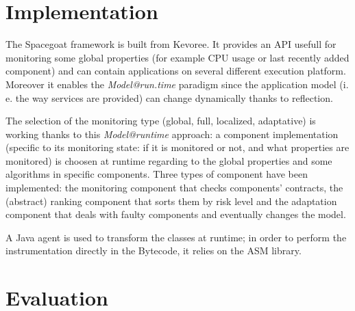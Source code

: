\section{Implementation}

The \textsf{Spacegoat} framework is built from \textsf{Kevoree}. It provides an API usefull for monitoring some global properties (for example CPU usage or last recently added component) and can contain applications on several different execution platform. Moreover it enables the \emph{Model@run.time} paradigm since the application model (i. e. the way services are provided) can change dynamically thanks to reflection. 

The selection of the monitoring type (global, full, localized, adaptative) is working thanks to this \emph{Model@runtime} approach: a component implementation (specific to  its monitoring state: if it is monitored or not, and what properties are monitored) is choosen at runtime regarding to the global properties and some algorithms in specific components. Three types of component have been implemented: the monitoring component that checks components' contracts, the (abstract) ranking component that sorts them by risk level and the adaptation component that deals with faulty components and eventually changes the model.

A Java agent is used to transform the classes at runtime; in order to perform the instrumentation directly in the Bytecode, it relies on the ASM library.

\section{Evaluation}
